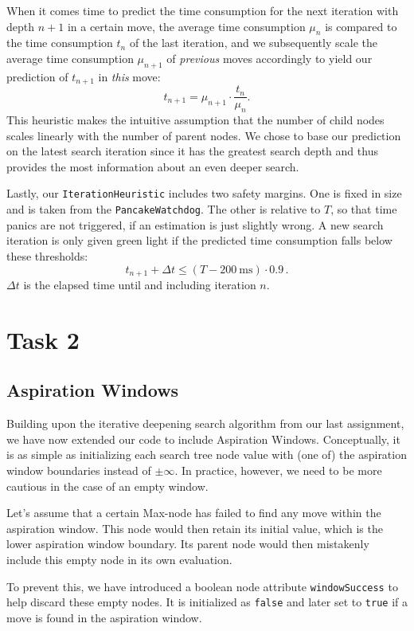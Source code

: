 \documentclass[a4paper,12pt]{article}
\begin{document}
When it comes time to predict the time consumption for the next iteration with depth $n+1$ in a certain move, the average time consumption $\mu_n$ is compared to the time consumption $t_n$ of the last iteration, and we subsequently scale
the average time consumption $\mu_{n+1}$ of \emph{previous} moves accordingly to yield our prediction of $t_{n+1}$ in \emph{this} move:
\[t_{n+1} = \mu_{n+1} \cdot \frac{t_n}{\mu_n}.\]
This heuristic makes the intuitive assumption that the number of child nodes scales linearly with the number of parent nodes. We chose to base our prediction on the latest search iteration since it has the greatest search depth and thus provides the most information about an even deeper search.

Lastly, our \texttt{IterationHeuristic} includes two safety margins. One is fixed in size and is taken from the \texttt{PancakeWatchdog}. The other is relative to $T$, so that time panics are not triggered, if an estimation is just slightly wrong. A new search iteration is only given green light if the predicted time consumption falls below these thresholds:
\[t_{n+1} + \Delta t \leq (T -\SI{200}{\milli\s}) \cdot 0.9\,.\]
$\Delta t$ is the elapsed time until and including iteration $n$.

\newpage

\section{Task 2}

\subsection{Aspiration Windows}
Building upon the iterative deepening search algorithm from our last assignment, we have now extended our code to include Aspiration Windows. Conceptually, it is as simple as initializing each search tree node value with (one of) the aspiration window boundaries instead of $\pm \infty$. In practice, however, we need to be more cautious in the case of an empty window.

Let's assume that a certain Max-node has failed to find any move within the aspiration window. This node would then retain its initial value, which is the lower aspiration window boundary. Its parent node would then mistakenly include this empty node in its own evaluation. 

To prevent this, we have introduced a boolean node attribute \texttt{windowSuccess} to help discard these empty nodes. It is initialized as \texttt{false} and later set to \texttt{true} if a move is found in the aspiration window.
\end{document}
